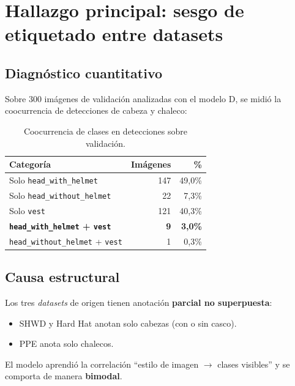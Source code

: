\documentclass[journal,onecolumn,11pt]{IEEEtran}
\begin{document}
\section{Hallazgo principal: sesgo de etiquetado entre datasets}
\label{sec:sesgo}

\subsection{Diagnóstico cuantitativo}

Sobre 300 imágenes de validación analizadas con el modelo D, se midió
la coocurrencia de detecciones de cabeza y chaleco:

\begin{table}[H]
\centering
\caption{Coocurrencia de clases en detecciones sobre validación.}
\label{tab:coocurrencia}
\begin{tabular}{l r r}
\toprule
\textbf{Categoría} & \textbf{Imágenes} & \textbf{\%} \\
\midrule
Solo \texttt{head\_with\_helmet} & 147 & 49{,}0\% \\
Solo \texttt{head\_without\_helmet} & 22 & 7{,}3\% \\
Solo \texttt{vest} & 121 & 40{,}3\% \\
\textbf{\texttt{head\_with\_helmet} + \texttt{vest}} & \textbf{9} & \textbf{3{,}0\%} \\
\texttt{head\_without\_helmet} + \texttt{vest} & 1 & 0{,}3\% \\
\bottomrule
\end{tabular}
\end{table}

\subsection{Causa estructural}

Los tres \textit{datasets} de origen tienen anotación
\textbf{parcial no superpuesta}:

\begin{itemize}[leftmargin=*]
    \item SHWD \cite{shwd} y Hard Hat anotan solo cabezas (con o
    sin casco).
    \item PPE anota solo chalecos.
\end{itemize}

El modelo aprendió la correlación ``estilo de imagen $\to$ clases
visibles'' y se comporta de manera \textbf{bimodal}.
\end{document}
